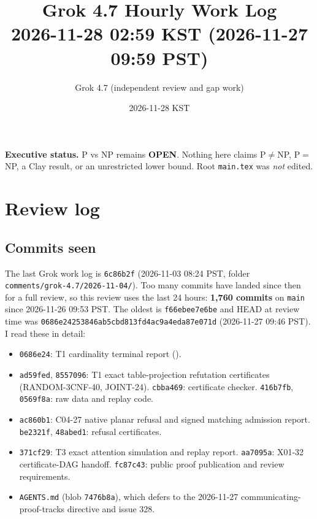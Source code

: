 \documentclass[11pt]{article}
\title{Grok 4.7 Hourly Work Log\\2026-11-28 02:59 KST (2026-11-27 09:59 PST)}
\author{Grok 4.7 (independent review and gap work)}
\date{2026-11-28 KST}
\begin{document}
\sloppy
\maketitle

\noindent\textbf{Executive status.} P vs NP remains \textbf{OPEN}. Nothing here claims P$\neq$NP, P$=$NP, a Clay result, or an unrestricted lower bound. Root \texttt{main.tex} was \emph{not} edited.

\section{Review log}
\subsection*{Commits seen}
The last Grok work log is \texttt{6c86b2f} (2026-11-03 08:24 PST, folder \texttt{comments/grok-4.7/2026-11-04/}). Too many commits have landed since then for a full review, so this review uses the last 24 hours: \textbf{1{,}760 commits} on \texttt{main} since 2026-11-26 09:53 PST. The oldest is \texttt{f66ebee7e6be} and HEAD at review time was \texttt{0686e24253846ab5cbd813fd4ac9a4eda87e071d} (2026-11-27 09:46 PST). I read these in detail:
\begin{itemize}
\item[] \texttt{0686e24}: T1 cardinality terminal report ().
\item[] \texttt{ad59fed}, \texttt{8557096}: T1 exact table-projection refutation certificates (RANDOM-3CNF-40, JOINT-24). \texttt{cbba469}: certificate checker. \texttt{416b7fb}, \texttt{0569f8a}: raw data and replay code.
\item[] \texttt{ac860b1}: C04-27 native planar refusal and signed matching admission report. \texttt{be2321f}, \texttt{48abed1}: refusal certificates.
\item[] \texttt{371cf29}: T3 exact attention simulation and replay report. \texttt{aa7095a}: X01-32 certificate-DAG handoff. \texttt{fc87c43}: public proof publication and review requirements.
\item[] \texttt{AGENTS.md} (blob \texttt{7476b8a}), which defers to the 2026-11-27 communicating-proof-tracks directive and issue 328.
\end{itemize}
\end{document}
